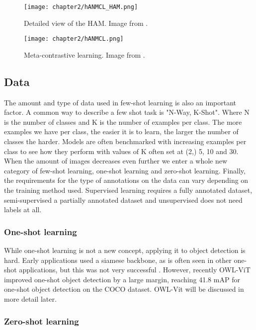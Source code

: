 \begin{figure}[H]
	\centering
	\texttt{[image: chapter2/hANMCL\_HAM.png]}
	\caption{\label{fig:2_hANMCL_HAM} Detailed view of the HAM. Image from \citet{hANMCL}.}
\end{figure}

\begin{figure}[H]
	\centering
	\texttt{[image: chapter2/hANMCL.png]}
	\caption{\label{fig:2_hANMCL} Meta-contrastive learning. Image from \citet{hANMCL}.}
\end{figure}

\subsection{Data}

The amount and type of data used in few-shot learning is also an important factor. A common way to describe a few shot task is "N-Way, K-Shot". Where N is the number of classes and K is the number of examples per class. The more examples we have per class, the easier it is to learn, the larger the number of classes the harder. Models are often benchmarked with increasing examples per class to see how they perform with values of K often set at (2,) 5, 10 and 30. When the amount of images decreases even further we enter a whole new category of few-shot learning, one-shot learning and zero-shot learning. Finally, the requirements for the type of annotations on the data can vary depending on the training method used. Supervised learning requires a fully annotated dataset, semi-supervised a partially annotated dataset and unsupervised does not need labels at all.

\subsubsection{One-shot learning}

While one-shot learning is not a new concept, applying it to object detection is hard. Early applications used a siamese backbone, as is often seen in other one-shot applications, but this was not very successful \citep{One-shot-siamese}. However, recently OWL-ViT \citep{owlvit} improved one-shot object detection by a large margin, reaching 41.8 mAP for one-shot object detection on the COCO dataset. OWL-Vit will be discussed in more detail later.

\subsubsection{Zero-shot learning}

